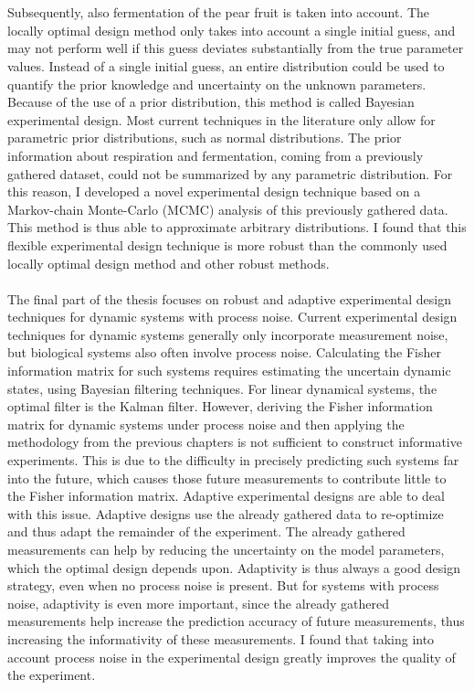 \\
\\
{\color{red}Subsequently, also fermentation of the pear fruit is taken into account}. The locally optimal design method only takes into account a single initial guess, and may not perform well if this guess deviates substantially from the true parameter values. Instead of a single initial guess, an entire distribution could be used to quantify the prior knowledge and uncertainty on the unknown parameters. Because of the use of a prior distribution, this method is called Bayesian experimental design. Most current techniques in the literature only allow for parametric prior distributions, such as normal distributions. The prior information about respiration and fermentation, coming from a previously gathered dataset, could not be summarized by any parametric distribution. For this reason, I developed a novel experimental design technique based on a Markov-chain Monte-Carlo (MCMC) analysis of this previously gathered data. This method is thus able to approximate arbitrary distributions. I found that this flexible experimental design technique is more robust than the commonly used locally optimal design method {\color{red} and other robust methods}.
\\
\\
{\color{red}The final part of the thesis} focuses on robust and adaptive experimental design techniques for dynamic systems with process noise. Current experimental design techniques for dynamic systems generally only incorporate measurement noise, but biological systems also often involve process noise. Calculating the Fisher information matrix for such systems requires estimating the uncertain dynamic states, using Bayesian filtering techniques. For linear dynamical systems, the optimal filter is the Kalman filter. {\color{red}However,} deriving the Fisher information matrix for dynamic systems under process noise and then applying the methodology from the previous chapters is not sufficient to construct informative experiments. This is due to the difficulty in precisely predicting such systems far into the future, which causes those future measurements to contribute little to the Fisher information matrix. Adaptive experimental designs are able to deal with this issue. Adaptive designs use the already gathered data to re-optimize and thus adapt the remainder of the experiment. The already gathered measurements can help by reducing the uncertainty on the model parameters, which the optimal design depends upon. Adaptivity is thus always a good design strategy, even when no process noise is present. But for systems with process noise, adaptivity is even more important, since the already gathered measurements help increase the prediction accuracy of future measurements, thus increasing the informativity of these measurements. I found that taking into account process noise in the experimental design greatly improves the quality of the experiment.